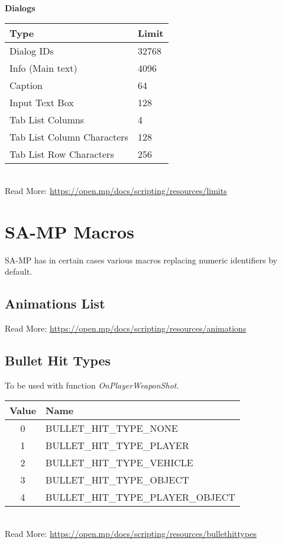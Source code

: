 \documentclass{article}
\begin{document}
\bigskip
\\\textbf{Dialogs}
\bigskip
\\\begin{tabular}{ |l|l| } 
\hline
Type & Limit \\
\hline
Dialog IDs & 32768 \\
Info (Main text) & 4096 \\
Caption & 64 \\
Input Text Box & 128 \\
Tab List Columns & 4 \\
Tab List Column Characters & 128 \\
Tab List Row Characters & 256 \\
\hline
\end{tabular}
\bigskip
\\Read More: \url{https://open.mp/docs/scripting/resources/limits}


\newpage
\section{SA-MP Macros}
SA-MP has in certain cases various macros replacing numeric identifiers by default.
\subsection{Animations List}
Read More: \url{https://open.mp/docs/scripting/resources/animations}


\subsection{Bullet Hit Types}
To be used with function \textit{OnPlayerWeaponShot}.
\bigskip
\\\begin{tabular}{ |c|l| } 
\hline
Value & Name \\
\hline
0 & BULLET\_HIT\_TYPE\_NONE \\
1 & BULLET\_HIT\_TYPE\_PLAYER \\
2 & BULLET\_HIT\_TYPE\_VEHICLE \\
3 & BULLET\_HIT\_TYPE\_OBJECT \\
4 & BULLET\_HIT\_TYPE\_PLAYER\_OBJECT \\
\hline
\end{tabular}
\bigskip
\\Read More: \url{https://open.mp/docs/scripting/resources/bullethittypes}
\end{document}
